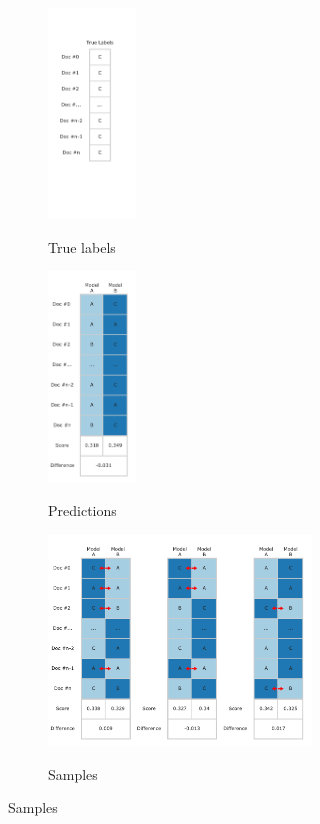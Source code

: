 \begin{figure}[htb!]
  \begin{subfigure}[t]{0.29\linewidth}
  \centering
  {\includegraphics[height=2.2in]{assets/figures/permutation_test/true_labels.pdf}\label{fig:permutation_test_true}}
  \caption{True labels}
  \end{subfigure}
  \hfill
  \begin{subfigure}[t]{.29\linewidth}
  \centering
  {\includegraphics[height=2.2in]{assets/figures/permutation_test/initial_predictions.pdf}\label{fig:permutation_test_model_predictions}}
  \caption{Predictions}
  \end{subfigure}
  \hfill
  \begin{subfigure}[t]{0.40\linewidth}
  \centering
  {\includegraphics[height=2.2in]{assets/figures/permutation_test/samples.pdf}\label{fig:permutation_test_samples}}
  \caption{Samples}
  \end{subfigure}

\end{figure}
